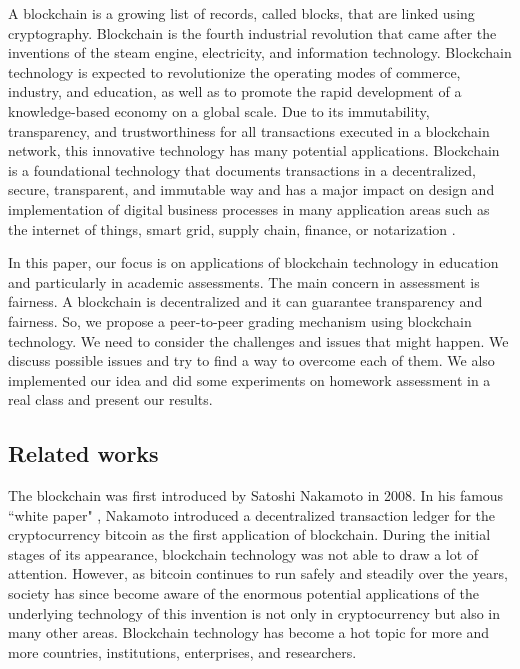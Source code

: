 \documentclass[manuscript,review,anonymous]{acmart}%
\begin{document}
A blockchain is a growing list of records, called blocks, that are linked using cryptography.
Blockchain is the fourth industrial revolution that came after the inventions of the steam engine, electricity, and information technology. Blockchain technology is expected to revolutionize the operating modes of commerce, industry, and education, as well as to promote the rapid development of a knowledge-based economy on a global scale. Due to its immutability, transparency, and trustworthiness for all transactions executed in a blockchain network, this innovative technology has many potential applications. 
Blockchain is a foundational technology that documents transactions in a decentralized, secure, transparent, and immutable way and has a major impact on
design and implementation of digital business processes in many application areas such as the internet of things, smart grid, supply chain, finance, or notarization \cite{ian,nar}.


In this paper, our focus is on applications of blockchain technology in education and particularly in academic assessments. The main concern in assessment is fairness.
A blockchain is decentralized and it can guarantee transparency and fairness. 
So, we propose a peer-to-peer grading mechanism using blockchain technology. We need to consider the challenges and issues that might happen. We 
discuss possible issues and try to find a way to overcome each of them.
We also implemented our idea and did some experiments on homework assessment in a real class and present our results.

 

\subsection{Related works}

The blockchain was first introduced by Satoshi Nakamoto in 2008. In his famous ``white paper" \cite{nak}, Nakamoto introduced a decentralized transaction ledger for the cryptocurrency bitcoin as the first application of blockchain.
During the initial stages of its appearance, blockchain technology was not able to draw a lot of attention. However, as bitcoin continues to run safely and steadily over the years, society has since become aware of the enormous potential applications of the underlying technology of this invention is not only in cryptocurrency but also in many other areas. Blockchain technology has become a hot topic for more and more countries, institutions, enterprises, and researchers.
\end{document}
